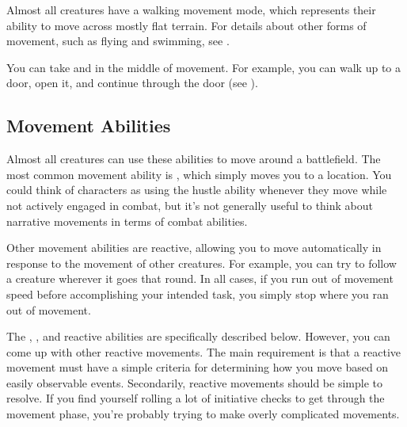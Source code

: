     Almost all creatures have a walking movement mode, which represents their ability to move across mostly flat terrain.
    For details about other forms of movement, such as flying and swimming, see .

    You can take  and  in the middle of movement.
    For example, you can walk up to a door, open it, and continue through the door (see ).

  \subsection{Movement Abilities}\label{Movement Abilities}

    Almost all creatures can use these abilities to move around a battlefield.
    The most common movement ability is , which simply moves you to a location.
    You could think of characters as using the hustle ability whenever they move while not actively engaged in combat, but it's not generally useful to think about narrative movements in terms of combat abilities.

    Other movement abilities are reactive, allowing you to move automatically in response to the movement of other creatures.
    For example, you can try to follow a creature wherever it goes that round.
    In all cases, if you run out of movement speed before accomplishing your intended task, you simply stop where you ran out of movement.

    The , , and  reactive abilities are specifically described below.
    However, you can come up with other reactive movements.
    The main requirement is that a reactive movement must have a simple criteria for determining how you move based on easily observable events.
    Secondarily, reactive movements should be simple to resolve.
    If you find yourself rolling a lot of initiative checks to get through the movement phase, you're probably trying to make overly complicated movements.

